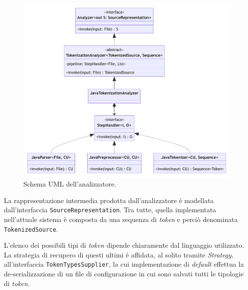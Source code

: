 \begin{figure}[h!]
    \centering
    \includegraphics[width=\textwidth]{resources/img/02-analyzer.pdf}
    \caption{Schema UML dell'analizzatore.}
    \label{img:02-analyzer}
\end{figure}

La rappresentazione intermedia prodotta dall'analizzatore è modellata dall'interfaccia \texttt{SourceRepresentation}. 
%
Tra tutte, quella implementata nell'attuale sistema è composta da una sequenza di \textit{token} e perciò denominata \texttt{TokenizedSource}.

L'elenco dei possibili tipi di \textit{token} dipende chiaramente dal linguaggio utilizzato.
%
La strategia di recupero di questi ultimi è affidata, al solito tramite \textit{Strategy}, all'interfaccia \texttt{TokenTypesSupplier}, la cui implementazione di \textit{default} effettua la de-serializzazione di un file di configurazione in cui sono salvati tutti le tipologie di \textit{token}.

